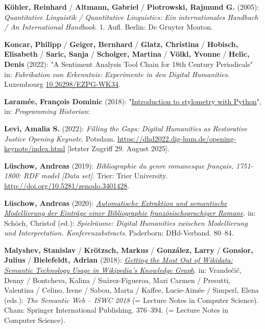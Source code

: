 \documentclass[
  12pt,
  letterpaper,
  DIV=11,
  numbers=noendperiod]{scrreprt}
\newlength{\cslhangindent}
\newenvironment{CSLReferences}[2] %
 {\begin{list}{}{%
  \setlength{\itemindent}{0pt}
  \setlength{\leftmargin}{0pt}
  \setlength{\parsep}{0pt}
  \ifodd #1
   \setlength{\leftmargin}{\cslhangindent}
   \setlength{\itemindent}{-1\cslhangindent}
  \fi
  \setlength{\itemsep}{#2\baselineskip}}}
 {\end{list}}
\begin{document}
\begin{CSLReferences}{1}{0}
\textbf{Köhler, Reinhard} / \textbf{Altmann, Gabriel} /
\textbf{Piotrowski, Rajmund G.} (2005): \emph{Quantitative {Linguistik}
/ {Quantitative} {Linguistics}: {Ein} internationales {Handbuch} / {An}
{International} {Handbook}}. 1. Aufl. Berlin: De Gruyter Mouton.

\textbf{Koncar, Philipp} / \textbf{Geiger, Bernhard} / \textbf{Glatz,
Christina} / \textbf{Hobisch, Elisabeth} / \textbf{Saric, Sanja} /
\textbf{Scholger, Martina} / \textbf{Völkl, Yvonne} / \textbf{Helic,
Denis} (2022): "A {Sentiment} {Analysis} {Tool} {Chain} for 18th
{Century} {Periodicals}" in: \emph{Fabrikation von {Erkenntnis}:
{Experimente} in den {Digital} {Humanities}}. Luxembourg
\href{https://doi.org/10.26298/EZPG-WK34}{10.26298/EZPG-WK34}.

\textbf{Laramée, François Dominic} (2018):
"\href{https://programminghistorian.org/en/lessons/introduction-to-stylometry-with-python}{Introduction
to stylometry with {Python}}", in: \emph{Programming Historian}:

\textbf{Levi, Amalia S.} (2022): \emph{Filling the {Gaps}: {Digital}
{Humanities} as {Restorative} {Justice} {\textbar} {Opening} {Keynote}}.
Potsdam. \url{https://dhd2022.dig-hum.de/opening-keynote/index.html}
{[}letzter Zugriff 29. August 2025{]}.

\textbf{Lüschow, Andreas} (2019): \emph{Bibliographie du genre
romanesque français, 1751-1800: {RDF} model {[}{Data} set{]}}. Trier:
Trier University. \url{http://doi.org/10.5281/zenodo.3401428}.

\textbf{Lüschow, Andreas} (2020):
\emph{\href{https://doi.org/10.5281/zenodo.3666690}{Automatische
{Extraktion} und semantische {Modellierung} der {Einträge} einer
{Bibliographie} französischsprachiger {Romane}}}. in: Schöch, Christof
(ed.): \emph{Spielräume: {Digital} {Humanities} zwischen {Modellierung}
und {Interpretation}. {Konferenzabstracts}}. Paderborn: DHd-Verband.
80--84.

\textbf{Malyshev, Stanislav} / \textbf{Krötzsch, Markus} /
\textbf{González, Larry} / \textbf{Gonsior, Julius} /
\textbf{Bielefeldt, Adrian} (2018):
\emph{\href{https://doi.org/10.1007/978-3-030-00668-6_23}{Getting the
{Most} {Out} of {Wikidata}: {Semantic} {Technology} {Usage} in
{Wikipedia}'s {Knowledge} {Graph}}}. in: Vrandečić, Denny / Bontcheva,
Kalina / Suárez-Figueroa, Mari Carmen / Presutti, Valentina / Celino,
Irene / Sabou, Marta / Kaffee, Lucie-Aimée / Simperl, Elena (eds.):
\emph{The {Semantic} {Web} -- {ISWC} 2018} (= Lecture {Notes} in
{Computer} {Science}). Cham: Springer International Publishing.
376--394. (= Lecture {Notes} in {Computer} {Science}).


\end{CSLReferences}
\end{document}
